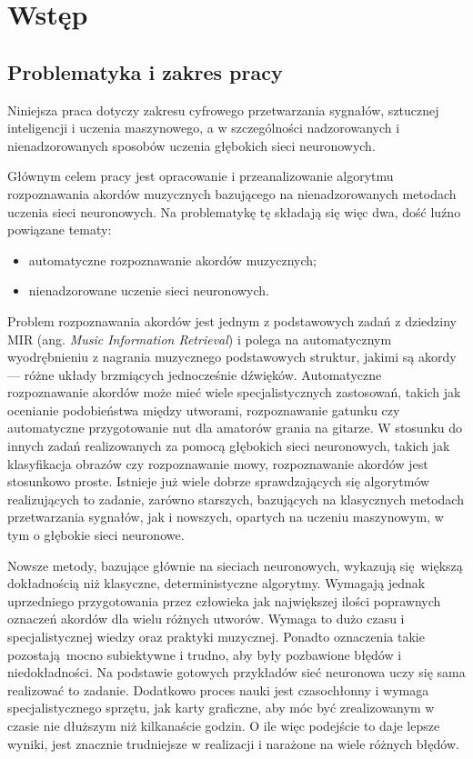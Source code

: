 \chapter{Wstęp} \label{chapter:introduction}



\section{Problematyka i zakres pracy}

Niniejsza praca dotyczy zakresu cyfrowego przetwarzania sygnałów, sztucznej inteligencji i uczenia maszynowego, a w szczególności nadzorowanych i nienadzorowanych sposobów uczenia głębokich sieci neuronowych.

Głównym celem pracy jest opracowanie i przeanalizowanie algorytmu rozpoznawania akordów muzycznych bazującego na nienadzorowanych metodach uczenia sieci neuronowych. Na problematykę tę składają się więc dwa, dość luźno powiązane tematy:
\begin{itemize}
    \item automatyczne rozpoznawanie akordów muzycznych;
    \item nienadzorowane uczenie sieci neuronowych.
\end{itemize}

Problem rozpoznawania akordów jest jednym z podstawowych zadań z dziedziny MIR (ang. \emph{Music Information Retrieval}) i polega na automatycznym wyodrębnieniu z nagrania muzycznego podstawowych struktur, jakimi są akordy --- różne układy brzmiących jednocześnie dźwięków. Automatyczne rozpoznawanie akordów może mieć wiele specjalistycznych zastosowań, takich jak ocenianie podobieństwa między utworami, rozpoznawanie gatunku czy automatyczne przygotowanie nut dla amatorów grania na gitarze. W stosunku do innych zadań realizowanych za pomocą głębokich sieci neuronowych, takich jak klasyfikacja obrazów czy rozpoznawanie mowy, rozpoznawanie akordów jest stosunkowo proste. Istnieje już wiele dobrze sprawdzających się algorytmów realizujących to zadanie, zarówno starszych, bazujących na klasycznych metodach przetwarzania sygnałów, jak i nowszych, opartych na uczeniu maszynowym, w tym o głębokie sieci neuronowe. 

Nowsze metody, bazujące głównie na sieciach neuronowych, wykazują się większą dokładnością niż klasyczne, deterministyczne algorytmy. Wymagają jednak uprzedniego przygotowania przez człowieka jak największej ilości poprawnych oznaczeń akordów dla wielu różnych utworów. Wymaga to dużo czasu i specjalistycznej wiedzy oraz praktyki muzycznej. Ponadto oznaczenia takie pozostają mocno subiektywne i trudno, aby były pozbawione błędów i niedokładności.  Na podstawie gotowych przykładów sieć neuronowa uczy się sama realizować to zadanie. Dodatkowo proces nauki jest czasochłonny i wymaga specjalistycznego sprzętu, jak karty graficzne, aby móc być zrealizowanym w czasie nie dłuższym niż kilkanaście godzin. O ile więc podejście to daje lepsze wyniki, jest znacznie trudniejsze w realizacji i narażone na wiele różnych błędów.

